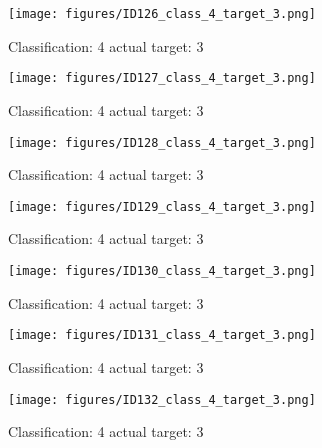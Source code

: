 \begin{figure}[h!]
\begin{center}
\texttt{[image: figures/ID126\_class\_4\_target\_3.png]}
\end{center}
\caption{ Classification: 4 actual target: 3}
\label{fig:ID126_class_4_target_3}
\end{figure}
\begin{figure}[h!]
\begin{center}
\texttt{[image: figures/ID127\_class\_4\_target\_3.png]}
\end{center}
\caption{ Classification: 4 actual target: 3}
\label{fig:ID127_class_4_target_3}
\end{figure}
\begin{figure}[h!]
\begin{center}
\texttt{[image: figures/ID128\_class\_4\_target\_3.png]}
\end{center}
\caption{ Classification: 4 actual target: 3}
\label{fig:ID128_class_4_target_3}
\end{figure}
\begin{figure}[h!]
\begin{center}
\texttt{[image: figures/ID129\_class\_4\_target\_3.png]}
\end{center}
\caption{ Classification: 4 actual target: 3}
\label{fig:ID129_class_4_target_3}
\end{figure}
\begin{figure}[h!]
\begin{center}
\texttt{[image: figures/ID130\_class\_4\_target\_3.png]}
\end{center}
\caption{ Classification: 4 actual target: 3}
\label{fig:ID130_class_4_target_3}
\end{figure}
\begin{figure}[h!]
\begin{center}
\texttt{[image: figures/ID131\_class\_4\_target\_3.png]}
\end{center}
\caption{ Classification: 4 actual target: 3}
\label{fig:ID131_class_4_target_3}
\end{figure}
\begin{figure}[h!]
\begin{center}
\texttt{[image: figures/ID132\_class\_4\_target\_3.png]}
\end{center}
\caption{ Classification: 4 actual target: 3}
\label{fig:ID132_class_4_target_3}
\end{figure}
